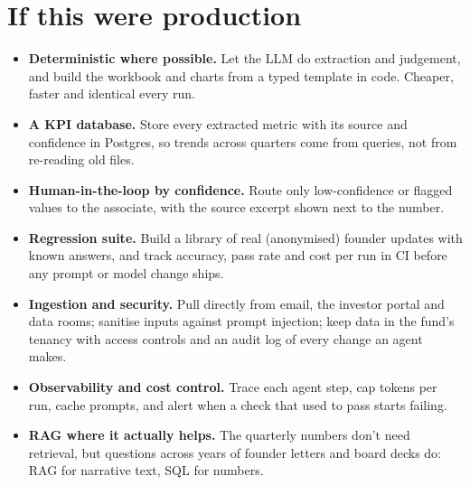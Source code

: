 \documentclass[11pt,a4paper]{article}
\begin{document}
\section{If this were production}
\begin{itemize}
  \item \textbf{Deterministic where possible.} Let the LLM do extraction and judgement, and build the
        workbook and charts from a typed template in code. Cheaper, faster and identical every run.
  \item \textbf{A KPI database.} Store every extracted metric with its source and confidence in Postgres, so
        trends across quarters come from queries, not from re-reading old files.
  \item \textbf{Human-in-the-loop by confidence.} Route only low-confidence or flagged values to the
        associate, with the source excerpt shown next to the number.
  \item \textbf{Regression suite.} Build a library of real (anonymised) founder updates with known answers,
        and track accuracy, pass rate and cost per run in CI before any prompt or model change ships.
  \item \textbf{Ingestion and security.} Pull directly from email, the investor portal and data rooms;
        sanitise inputs against prompt injection; keep data in the fund's tenancy with access controls and an
        audit log of every change an agent makes.
  \item \textbf{Observability and cost control.} Trace each agent step, cap tokens per run, cache prompts,
        and alert when a check that used to pass starts failing.
  \item \textbf{RAG where it actually helps.} The quarterly numbers don't need retrieval, but questions across
        years of founder letters and board decks do: RAG for narrative text, SQL for numbers.
\end{itemize}
\end{document}
